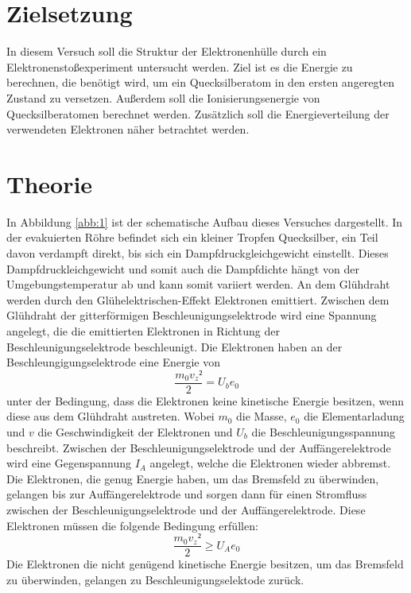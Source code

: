 \section{Zielsetzung}
In diesem Versuch soll die Struktur der Elektronenhülle durch ein Elektronenstoßexperiment untersucht werden.
Ziel ist es die Energie zu berechnen, die benötigt wird, um ein Quecksilberatom in den ersten angeregten Zustand zu versetzen. Außerdem soll die
Ionisierungsenergie von Quecksilberatomen berechnet werden. Zusätzlich soll die Energieverteilung der verwendeten Elektronen näher betrachtet werden.

\section{Theorie}
In Abbildung \ref{abb:1} ist der schematische Aufbau dieses Versuches dargestellt. In der evakuierten Röhre befindet sich ein kleiner Tropfen Quecksilber,
ein Teil davon verdampft direkt, bis sich ein Dampfdruckgleichgewicht einstellt. Dieses Dampfdruckleichgewicht und somit auch die Dampfdichte hängt von
der Umgebungstemperatur ab und kann somit variiert werden.
An dem Glühdraht werden durch den Glühelektrischen-Effekt Elektronen emittiert. Zwischen dem Glühdraht der gitterförmigen Beschleunigungselektrode wird eine
Spannung angelegt, die die emittierten Elektronen in Richtung der Beschleunigungselektrode beschleunigt. Die Elektronen haben an der Beschleungigungselektrode
eine Energie von
\begin{equation}
  \label{eq:1}
  \frac{m_0 v_z²}{2} = U_b e_0
\end{equation}
unter der Bedingung, dass die Elektronen keine kinetische Energie besitzen, wenn diese aus dem Glühdraht austreten. Wobei $m_0$ die Masse, $e_0$
die Elementarladung und $v$ die Geschwindigkeit der Elektronen und $U_b$ die Beschleunigungsspannung beschreibt.
Zwischen der Beschleunigungselektrode und der Auffängerelektrode wird eine Gegenspannung $I_A$ angelegt, welche die Elektronen wieder abbremst. Die Elektronen,
die genug Energie haben, um das Bremsfeld zu überwinden, gelangen bis zur Auffängerelektrode und sorgen dann für einen Stromfluss zwischen der Beschleunigungselektrode
und der Auffängerelektrode. Diese Elektronen müssen die folgende Bedingung erfüllen:
\begin{equation}
  \label{eq:2}
  \frac{m_0 v_z²}{2} \geq U_A  e_0
\end{equation}
Die Elektronen die nicht genügend kinetische Energie besitzen, um das Bremsfeld zu überwinden, gelangen zu Beschleunigungselektode zurück.

